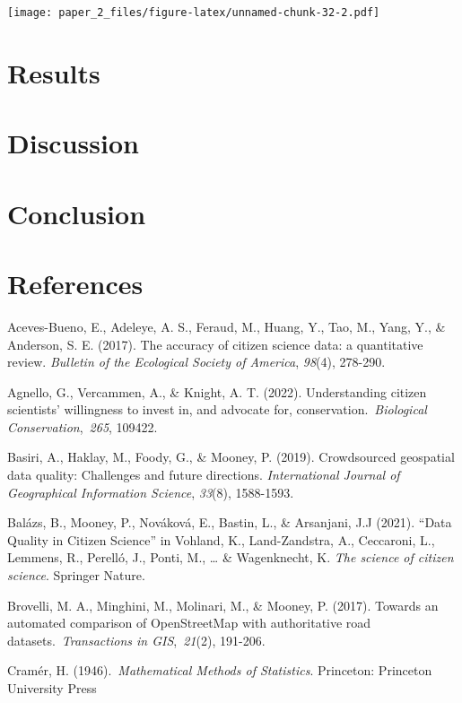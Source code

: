 \documentclass[
]{article}
\begin{document}
\texttt{[image: paper\_2\_files/figure-latex/unnamed-chunk-32-2.pdf]}

\hypertarget{results-1}{%
\section{Results}\label{results-1}}

\hypertarget{discussion}{%
\section{Discussion}\label{discussion}}

\hypertarget{conclusion}{%
\section{Conclusion}\label{conclusion}}

\hypertarget{references}{%
\section{References}\label{references}}

Aceves-Bueno, E., Adeleye, A. S., Feraud, M., Huang, Y., Tao, M., Yang,
Y., \& Anderson, S. E. (2017). The accuracy of citizen science data: a
quantitative review. \emph{Bulletin of the Ecological Society of
America}, \emph{98}(4), 278-290.

Agnello, G., Vercammen, A., \& Knight, A. T. (2022). Understanding
citizen scientists' willingness to invest in, and advocate for,
conservation.~\emph{Biological Conservation},~\emph{265}, 109422.

Basiri, A., Haklay, M., Foody, G., \& Mooney, P. (2019). Crowdsourced
geospatial data quality: Challenges and future directions.
\emph{International Journal of Geographical Information Science},
\emph{33}(8), 1588-1593.

Balázs, B., Mooney, P., Nováková, E., Bastin, L., \& Arsanjani, J.J
(2021). ``Data Quality in Citizen Science'' in Vohland, K.,
Land-Zandstra, A., Ceccaroni, L., Lemmens, R., Perelló, J., Ponti, M.,
\ldots{} \& Wagenknecht, K. \emph{The science of citizen science}.
Springer Nature.

Brovelli, M. A., Minghini, M., Molinari, M., \& Mooney, P. (2017).
Towards an automated comparison of OpenStreetMap with authoritative road
datasets.~\emph{Transactions in GIS},~\emph{21}(2), 191-206.

Cramér, H. (1946).~\emph{Mathematical Methods of Statistics}. Princeton:
Princeton University Press
\end{document}
